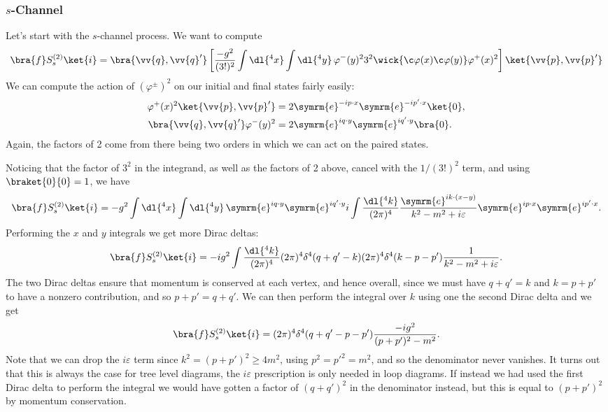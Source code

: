 \documentclass[fleqn]{NotesClass}
\newcommand{\e}{\symrm{e}}
\begin{document}
    \subsubsection{\texorpdfstring{\(s\)}{s}-Channel}
    Let's start with the \(s\)-channel process.
    We want to compute
    \begin{equation*}
        \bra{f} S^{(2)}_{s} \ket{i} = \bra{\vv{q}, \vv{q}'}\left[ \frac{-g^2}{(3!)^2} \int \dl{^4x} \int \dl{^4y} \, \varphi^-(y)^2 3^2 \wick{\c \varphi(x) \c \varphi(y)} \varphi^+(x)^2 \right] \ket{\vv{p}, \vv{p}'}
    \end{equation*}
    We can compute the action of \((\varphi^{\pm})^2\) on our initial and final states fairly easily:
    \begin{align}
        \varphi^+(x)^2 \ket{\vv{p}, \vv{p}'} &= 2\e^{-ip\cdot x} \e^{-ip'\cdot x}\ket{0},\\
        \bra{\vv{q}, \vv{q}'} \varphi^-(y)^2 &= 2\e^{iq\cdot y} \e^{iq'\cdot y}\bra{0}.
    \end{align}
    Again, the factors of 2 come from there being two orders in which we can act on the paired states.
    
    Noticing that the factor of \(3^2\) in the integrand, as well as the factors of 2 above, cancel with the \(1/(3!)^2\) term, and using \(\braket{0}{0} = 1\), we have
    \begin{equation*}
        \bra{f} S^{(2)}_{s} \ket{i} = -g^2 \int \dl{^4x} \int \dl{^4y} \, \e^{iq\cdot y} \e^{iq'\cdot y} i \int \frac{\dl{^4k}}{(2\pi)^4} \frac{\e^{ik\cdot (x - y)}}{k^2 - m^2 + i\varepsilon} \e^{ip\cdot x} \e^{ip' \cdot x}.
    \end{equation*}
    Performing the \(x\) and \(y\) integrals we get more Dirac deltas:
    \begin{equation*}
        \bra{f} S^{(2)}_{s} \ket{i} = -ig^2 \int \frac{\dl{^4k}}{(2\pi)^4} (2\pi)^4 \delta^4(q + q' - k) (2\pi)^4 \delta^4(k - p - p') \frac{1}{k^2 - m^2 + i\varepsilon}.
    \end{equation*}
    The two Dirac deltas ensure that momentum is conserved at each vertex, and hence overall, since we must have \(q + q' = k\) and \(k = p + p'\) to have a nonzero contribution, and so \(p + p' = q + q'\).
    We can then perform the integral over \(k\) using one the second Dirac delta and we get
    \begin{equation}
        \bra{f} S^{(2)}_{s} \ket{i} = (2\pi)^4\delta^4(q + q' - p - p') \frac{-ig^2}{(p + p')^2 - m^2}.
    \end{equation}
    Note that we can drop the \(i\varepsilon\) term since \(k^2 = (p + p')^2 \ge 4m^2\), using \(p^2 = p'^2 = m^2\), and so the denominator never vanishes.
    It turns out that this is always the case for tree level diagrams, the \(i\varepsilon\) prescription is only needed in loop diagrams.
    If instead we had used the first Dirac delta to perform the integral we would have gotten a factor of \((q + q')^2\) in the denominator instead, but this is equal to \((p + p')^2\) by momentum conservation.
    
\end{document}

